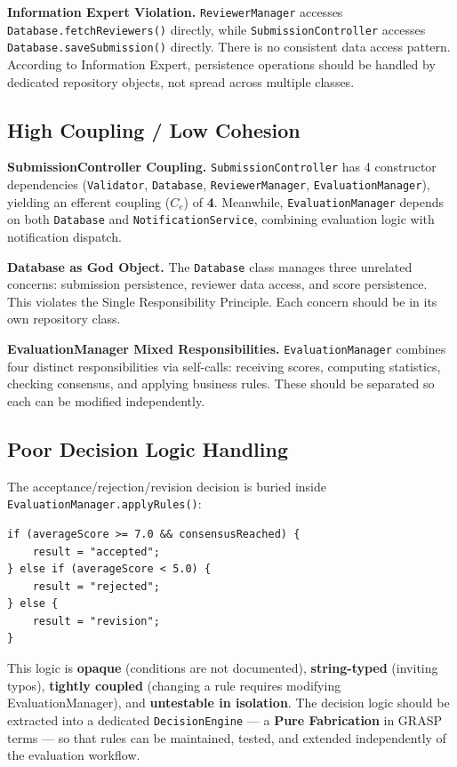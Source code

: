 \documentclass[12pt, a4paper]{article}
\begin{document}
\textbf{Information Expert Violation.}
\texttt{ReviewerManager} accesses \texttt{Database.fetchReviewers()} directly, while \texttt{SubmissionController} accesses \texttt{Database.saveSubmission()} directly. There is no consistent data access pattern. According to Information Expert, persistence operations should be handled by dedicated repository objects, not spread across multiple classes.

\subsection{High Coupling / Low Cohesion}

\textbf{SubmissionController Coupling.}
\texttt{SubmissionController} has 4 constructor dependencies (\texttt{Validator}, \texttt{Database}, \texttt{ReviewerManager}, \texttt{EvaluationManager}), yielding an efferent coupling ($C_e$) of \textbf{4}. Meanwhile, \texttt{EvaluationManager} depends on both \texttt{Database} and \texttt{NotificationService}, combining evaluation logic with notification dispatch.

\textbf{Database as God Object.}
The \texttt{Database} class manages three unrelated concerns: submission persistence, reviewer data access, and score persistence. This violates the Single Responsibility Principle. Each concern should be in its own repository class.

\textbf{EvaluationManager Mixed Responsibilities.}
\texttt{EvaluationManager} combines four distinct responsibilities via self-calls: receiving scores, computing statistics, checking consensus, and applying business rules. These should be separated so each can be modified independently.

\subsection{Poor Decision Logic Handling}

The acceptance/rejection/revision decision is buried inside \texttt{EvaluationManager.applyRules()}:

\begin{lstlisting}
if (averageScore >= 7.0 && consensusReached) {
    result = "accepted";
} else if (averageScore < 5.0) {
    result = "rejected";
} else {
    result = "revision";
}
\end{lstlisting}

This logic is \textbf{opaque} (conditions are not documented), \textbf{string-typed} (inviting typos), \textbf{tightly coupled} (changing a rule requires modifying EvaluationManager), and \textbf{untestable in isolation}. The decision logic should be extracted into a dedicated \texttt{DecisionEngine} --- a \textbf{Pure Fabrication} in GRASP terms --- so that rules can be maintained, tested, and extended independently of the evaluation workflow.
\end{document}
